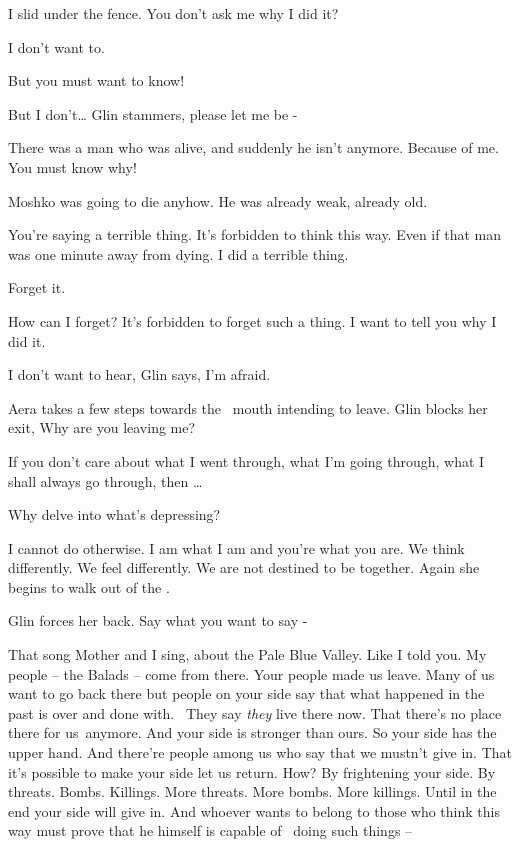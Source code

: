 \documentclass[letterpaper]{article}
\begin{document}
{\textquotedbl}I slid under the fence. You don't ask me why I did it?{\textquotedbl} 

{\textquotedbl}I don't want to.{\textquotedbl} 

{\textquotedbl}But you must want to know!{\textquotedbl} 

{\textquotedbl}But I don't{\dots}{\textquotedbl} Glin stammers, {\textquotedbl}please let me be -{\textquotedbl} 

{\textquotedbl}There was a man who was alive, and suddenly he isn't anymore. Because of me. You must know
why!{\textquotedbl} 

{\textquotedbl}Moshko was going to die anyhow. He was already weak, already old.{\textquotedbl} 

{\textquotedbl}You're saying a terrible thing. It's forbidden to think this way. Even if that man was one minute away
from dying. I did a terrible thing.{\textquotedbl} 

{\textquotedbl}Forget it.{\textquotedbl} 

{\textquotedbl}How can I forget? It's forbidden to forget such a thing. I want to tell you why I did it.{\textquotedbl} 

{\textquotedbl}I don't want to hear,{\textquotedbl} Glin says, {\textquotedbl}I'm afraid.{\textquotedbl}

Aera takes a few steps towards the \ mouth{ }intending to leave. Glin blocks her exit, {\textquotedbl}Why
are you leaving me?{\textquotedbl} 

{\textquotedbl}If you don't care about what I went through, what I'm going through, what I shall always go through, then
{\dots}{\textquotedbl} 

{\textquotedbl}Why delve into what's depressing?{\textquotedbl} 

{\textquotedbl}I cannot do otherwise. I am what I am and you're what you are. We think differently. We feel differently.
We are not destined to be together.{\textquotedbl} Again she begins to walk out of the . 

Glin forces her back. {\textquotedbl}Say what you want to say -{\textquotedbl} 

{\textquotedbl}That song Mother and I sing, about the Pale Blue Valley. Like I told you. My people -- the Balads -- come
from there. Your people made us leave. Many of us want to go back there but people on your side say that what happened
in the past is over and done with. ~They say \textit{they }live there now. That there's no place there for us~anymore.
And your side is stronger than ours. So your side has the upper hand. And there're people among us who say that we
mustn't give in. That it's possible to make your side let us return. How? By frightening your side. By threats. Bombs.
Killings. More threats. More bombs. More killings. Until in the end your side will give in. And whoever wants to belong
to those who think this way must prove that he himself is capable of~ doing such things --{\textquotedbl} 
\end{document}
